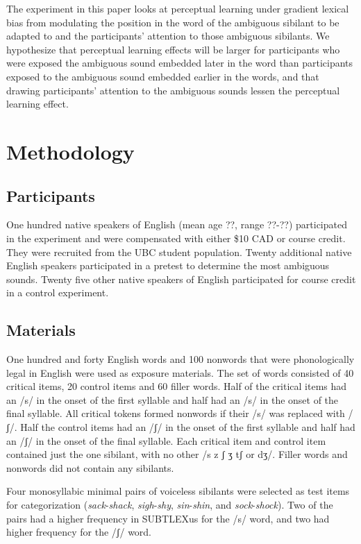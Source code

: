\documentclass[a4paper,11pt,twocolumn]{article}
\begin{document}
The experiment in this paper looks at perceptual learning under gradient lexical bias from modulating the position in the word of the ambiguous sibilant to be adapted to and the participants' attention to those ambiguous sibilants.  We hypothesize that perceptual learning effects will be larger for participants who were exposed the ambiguous sound embedded later in the word than participants exposed to the ambiguous sound embedded earlier in the words, and that drawing participants' attention to the ambiguous sounds lessen the perceptual learning effect.

\section{Methodology}

\subsection{Participants}

One hundred native speakers of English (mean age ??, range ??-??) participated in the experiment and were compensated with either \$10 CAD or course credit. They were recruited from the UBC student population.  Twenty additional native English speakers participated in a pretest to determine the most ambiguous sounds.  Twenty five other native speakers of English participated for course credit in a control experiment.

\subsection{Materials}

One hundred and forty English words and 100 nonwords that were phonologically legal in English were used as exposure materials.  The set of words consisted of 40 critical items, 20 control items and 60 filler words.  Half of the critical items had an /s/ in the onset of the first syllable and half had an /s/ in the onset of the final syllable.  All critical tokens formed nonwords if their /s/ was replaced with /ʃ/. Half the control items had an /ʃ/ in the onset of the first syllable and half had an /ʃ/ in the onset of the final syllable.  Each critical item and control item contained just the one sibilant, with no other /s z ʃ ʒ tʃ or dʒ/.  Filler words and nonwords did not contain any sibilants.

Four monosyllabic minimal pairs of voiceless sibilants were selected as test items for categorization (\emph{sack}-\emph{shack}, \emph{sigh}-\emph{shy}, \emph{sin}-\emph{shin}, and \emph{sock}-\emph{shock}).  Two of the pairs had a higher frequency in SUBTLEXus \cite{Brysbaert2009} for the /s/ word, and two had higher frequency for the /ʃ/ word.
\end{document}
